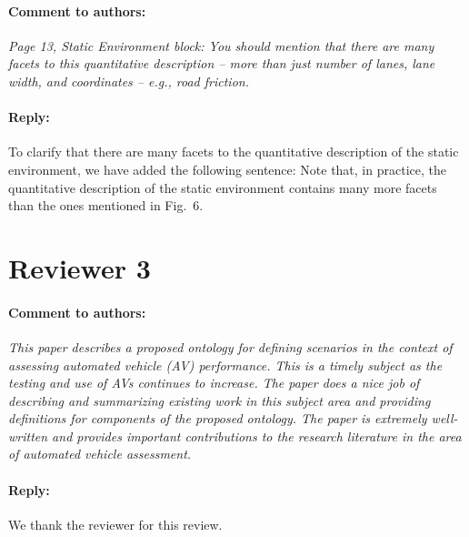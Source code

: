 \documentclass[10pt,final,a4paper,oneside,onecolumn]{article}
\newcommand{\toauthor}{\paragraph*{Comment to authors:} \itshape}
\newcommand{\fromauthor}{\paragraph*{Reply:} \normalfont}
\newcommand{\cstart}{\cbstart\color{red}}
\newcommand{\cend}{\cbend\color{black}}
\begin{document}
\toauthor Page 13, Static Environment block: You should mention that there are many facets to this quantitative description -- more than just number of lanes, lane width, and coordinates -- e.g., road friction.

\fromauthor To clarify that there are many facets to the quantitative description of the static environment, we have added the following sentence: \cstart Note that, in practice, the quantitative description of the static environment contains many more facets than the ones mentioned in Fig.~6.\cend



\section*{Reviewer 3}

\toauthor This paper describes a proposed ontology for defining scenarios in the context of assessing automated vehicle (AV) performance. This is a timely subject as the testing and use of AVs continues to increase. The paper does a nice job of describing and summarizing existing work in this subject area and providing definitions for components of the proposed ontology. The paper is extremely well-written and provides important contributions to the research literature in the area of automated vehicle assessment.

\fromauthor We thank the reviewer for this review.



\printbibliography
\end{document}
